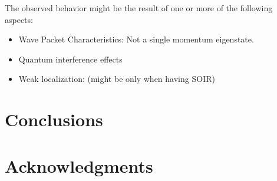 \documentclass[twocolumn]{revtex4-2}
\begin{document}
        The observed behavior might be the result of one or more of the following aspects:

    \begin{itemize}
        \item Wave Packet Characteristics: Not a single momentum eigenstate.
        \item Quantum interference effects\cite{MolgadoMex2018}
        \item Weak localization: (might be only when having SOIR)
    \end{itemize}

    \section{Conclusions}\label{sec:conclusions}


    \section*{Acknowledgments}

    
    
\end{document}
